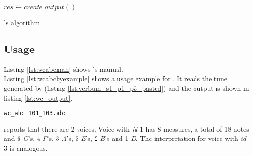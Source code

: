 \begin{algorithm}[h]
  $res \gets create\_output()$\\
  \caption{\wcabc{}'s algorithm}
  \label{alg:wcabc}
\end{algorithm}

\subsection*{Usage}

Listing \ref{lst:wcabcman} shows \wcabc{}'s manual.\\



Listing \ref{lst:wcabcbyexample} shows a usage example for \wcabc{}. It reads the tune generated by
\pasteabc{} (listing \ref{lst:verbum_s1_p1_p3_pasted}) and the output is shown in listing
\ref{lst:wc_output}.\\

\begin{lstlisting}[caption={\wcabc{} by example},label={lst:wcabcbyexample},captionpos=t,abovecaptionskip=-\medskipamount]
wc_abc 101_103.abc
\end{lstlisting}



\wcabc{} reports that there are 2 voices. Voice with \emph{id} 1 has 8 measures, a total of 18 notes
and 6 \emph{G}'s, 4 \emph{F}'s, 3 \emph{A}'s, 3 \emph{E}'s, 2 \emph{B}'s and 1 \emph{D}.  The
interpretation for voice with \emph{id} 3 is analogous.
